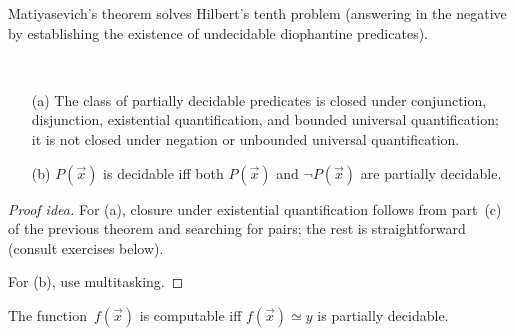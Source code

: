 \begin{app}
Matiyasevich's theorem solves Hilbert's tenth problem (answering in the negative by establishing the existence of undecidable diophantine predicates).
\end{app}

\begin{thm}\ 
\begin{enumerate}[itemsep=0pt]
\item[(a)] The class of partially decidable predicates is closed under conjunction, disjunction, existential quantification, and bounded universal quantification; it is not closed under negation or unbounded universal quantification.
\item[(b)] \(P(\vec{x})\) is decidable iff both \(P(\vec{x})\) and \(\lnot P(\vec{x})\) are partially decidable.
\end{enumerate}
\end{thm}
\begin{proof}[Proof idea]
For (a), closure under existential quantification follows from part~(c) of the previous theorem and searching for pairs; the rest is straightforward (consult exercises below).

For (b), use multitasking.
\end{proof}

\begin{thm}
The function~\(f(\vec{x})\) is computable iff \(f(\vec{x})\simeq y\) is partially decidable.
\end{thm}
